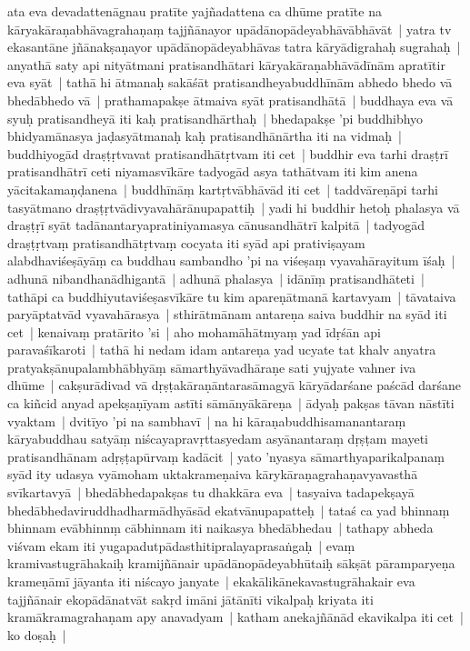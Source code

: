 \documentclass[article,12pt,a4paper]{memoir}%
\newcounter{parCount}
\begin{document}
	  \pstart \leavevmode%
	\label{thakur75-125.26}ata eva devadattenāgnau pratīte yajñadattena ca dhūme pratīte na kāryakāraṇabhāvagrahaṇaṃ tajjñānayor upādānopādeyabhāvābhāvāt | yatra tv ekasantāne jñānakṣaṇayor upādānopādeyabhāvas tatra kāryādigrahaḥ sugrahaḥ | anyathā saty api nityātmani pratisandhātari kāryakāraṇabhāvādīnām apratītir eva syāt | \label{thakur75-125.30} tathā hi ātmanaḥ sakāśāt pratisandheyabuddhīnām abhedo bhedo vā bhedābhedo vā | \label{thakur75-125.31} prathamapakṣe ātmaiva syāt pratisandhātā | buddhaya eva vā syuḥ pratisandheyā iti kaḥ pratisandhārthaḥ | \label{thakur75-125.32} bhedapakṣe 'pi buddhibhyo bhidyamānasya jaḍasyātmanaḥ kaḥ pratisandhānārtha iti na vidmaḥ | \label{thakur75-125.33} buddhiyogād draṣṭṛtvavat pratisandhātṛtvam iti cet | \label{thakur75-126.1} buddhir eva tarhi draṣṭrī pratisandhātrī ceti niyamasvīkāre tadyogād asya tathātvam iti kim anena yācitakamaṇḍanena | \label{thakur75-126.2} buddhīnāṃ kartṛtvābhāvād iti cet | \label{thakur75-126.2a} taddvāreṇāpi tarhi tasyātmano draṣṭṛtvādivyavahārānupapattiḥ | yadi hi buddhir hetoḥ phalasya vā draṣṭṛī syāt tadānantaryapratiniyamasya cānusandhātrī kalpitā | tadyogād draṣṭṛtvaṃ pratisandhātṛtvaṃ cocyata iti syād api prativiṣayam alabdhaviśeṣāyāṃ ca buddhau sambandho 'pi na viśeṣaṃ vyavahārayitum īśaḥ | adhunā nibandhanādhigantā | adhunā phalasya | idānīṃ pratisandhāteti | tathāpi ca buddhiyutaviśeṣasvīkāre tu kim apareṇātmanā kartavyam | tāvataiva paryāptatvād vyavahārasya | \label{thakur75-126.9} sthirātmānam antareṇa saiva buddhir na syād iti cet | \label{thakur75-126.9a} kenaivaṃ pratārito 'si | aho mohamāhātmyaṃ yad īdṛśān api paravaśīkaroti | tathā hi nedam idam antareṇa yad ucyate tat khalv anyatra pratyakṣānupalambhābhyāṃ sāmarthyāvadhāraṇe sati yujyate vahner iva dhūme | cakṣurādivad vā dṛṣṭakāraṇāntarasāmagyā kāryādarśane paścād darśane ca kiñcid anyad apekṣaṇīyam astīti sāmānyākāreṇa | \label{thakur75-126.14} ādyaḥ pakṣas tāvan nāstīti vyaktam | dvitīyo 'pi na sambhavī | na hi kāraṇabuddhisamanantaraṃ kāryabuddhau satyāṃ niścayapravṛttasyedam asyānantaraṃ dṛṣṭam mayeti pratisandhānam adṛṣṭapūrvaṃ kadācit | yato 'nyasya sāmarthyaparikalpanaṃ syād ity udasya vyāmoham uktakrameṇaiva kārykāraṇagrahaṇavyavasthā svīkartavyā | \label{thakur75-126.18} bhedābhedapakṣas tu dhakkāra eva | tasyaiva tadapekṣayā bhedābhedaviruddhadharmādhyāsād ekatvānupapatteḥ | tataś ca yad bhinnaṃ bhinnam evābhinnṃ cābhinnam iti naikasya bhedābhedau | tathapy abheda viśvam ekam iti yugapadutpādasthitipralayaprasaṅgaḥ | \label{thakur75-126.20} evaṃ kramivastugrāhakaiḥ kramijñānair upādānopādeyabhūtaiḥ sākṣāt pāramparyeṇa krameṇāmī jāyanta iti niścayo janyate | ekakālikānekavastugrāhakair eva tajjñānair ekopādānatvāt sakṛd imāni jātānīti vikalpaḥ kriyata iti kramākramagrahaṇam apy anavadyam | \label{thakur75-126.24} katham anekajñānād ekavikalpa iti cet | \label{thakur75-126.24a} ko doṣaḥ |
\end{document}
